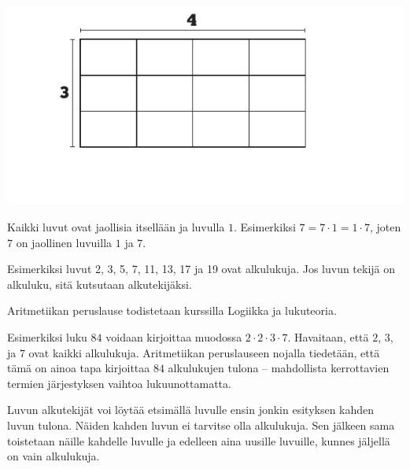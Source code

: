 \begin{center}
\includegraphics[scale=0.85]{pictures/Kuva2-4-3x4.pdf}
\end{center}
    
Kaikki luvut ovat jaollisia itsellään ja luvulla $1$. Esimerkiksi $7=7 \cdot 1=1 \cdot 7$, joten $7$ on jaollinen luvuilla $1$ ja $7$.
    
    
Esimerkiksi luvut 2, 3, 5, 7, 11, 13, 17 ja 19 ovat alkulukuja. Jos luvun tekijä on alkuluku, sitä kutsutaan alkutekijäksi.
    
    
Aritmetiikan peruslause todistetaan kurssilla Logiikka ja lukuteoria.
    
Esimerkiksi luku $84$ voidaan kirjoittaa muodossa $2\cdot 2\cdot 3\cdot 7$. Havaitaan, että $2$, $3$, ja $7$ ovat kaikki alkulukuja. Aritmetiikan peruslauseen nojalla tiedetään, että tämä on ainoa tapa kirjoittaa $84$ alkulukujen tulona -- mahdollista kerrottavien termien järjestyksen vaihtoa lukuunottamatta.
    
Luvun alkutekijät voi löytää etsimällä luvulle ensin jonkin esityksen kahden luvun tulona. Näiden kahden luvun ei tarvitse olla alkulukuja. Sen jälkeen sama toistetaan näille kahdelle luvulle ja edelleen aina uusille luvuille, kunnes jäljellä on vain alkulukuja.
